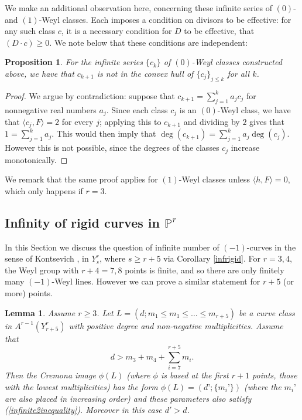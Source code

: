 \documentclass[12pt]{article}
\newtheorem{lemma}[equation]{Lemma}
\newtheorem{proposition}[equation]{Proposition}
\numberwithin{equation}{section}
\numberwithin{subeq}{equation}
\begin{document}
We make an additional observation here, concerning these infinite series of $(0)$- and $(1)$-Weyl classes.  Each imposes a condition on divisors to be effective: for any such class $c$, it is a necessary condition for $D$ to be effective, that $(D\cdot c) \geq 0$.  We note below that these conditions are independent:

\begin{proposition}\label{independentconditions}
For the infinite series $\{c_k\}$ of $(0)$-Weyl classes constructed above,
we have that $c_{k+1}$ is not in the convex hull of $\{c_j \}_{j\leq k}$ for all $k$.
\end{proposition}

\begin{proof}
We argue by contradiction: suppose that $c_{k+1} = \sum_{j=1}^k a_j c_j$ for nonnegative real numbers $a_j$.
Since each class $c_j$ is an $(0)$-Weyl class,
we have that $\langle c_j , F \rangle = 2$ for every $j$;
applying this to $c_{k+1}$ and dividing by $2$ gives that
$1 = \sum_{j=1}^k a_j$.
This would then imply that $\deg(c_{k+1}) = \sum_{j=1}^k a_j \deg(c_j)$.
However this is not possible, since the degrees of the classes $c_j$ increase monotonically.
\end{proof}

We remark that the same proof applies for $(1)$-Weyl classes unless $\langle h,F\rangle = 0$,
which only happens if $r=3$.


\subsection{Infinity of rigid curves in $\mathbb{P}^r$}\label{infinite2}

In this Section we discuss the question of infinite number of $(-1)$-curves in the sense of Kontsevich \cite{maxim1}, in $Y^r_s$, where $s \geq r+5$ via
Corollary \ref{infrigid}. 
For $r=3, 4$, the Weyl group with $r+4=7,8$ points is finite,
and so there are only finitely many $(-1)$-Weyl lines.
However we can prove a similar statement for $r+5$ (or more) points.

\begin{lemma}\label{infiniteWeylLemmar4} Assume $r \geq 3$.
Let $L = (d;m_1 \leq m_1 \leq \ldots \leq m_{r+5})$
be a curve class in $A^{r-1}(Y_{r+5}^r)$
with positive degree and non-negative multiplicities.
Assume that
\begin{equation}\label{infinite2inequality}
d > m_3 + m_4 + \sum_{i=7}^{r+5} m_i.
\end{equation}
Then the Cremona image $\phi(L)$
(where $\phi$ is based at the first $r+1$ points, those with the lowest multiplicities)
has the form $\phi(L) = (d’; \{m_i’\})$
(where the $m_i’$ are also placed in increasing order)
and these parameters also satisfy (\ref{infinite2inequality}).
Moreover in this case $d' > d$.
\end{lemma}
\end{document}
